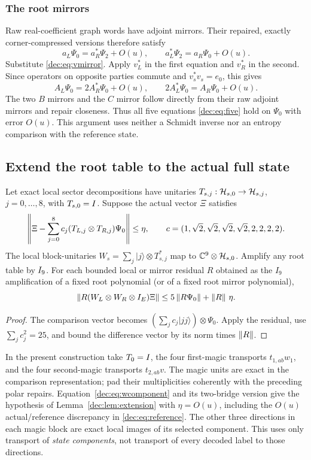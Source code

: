 \subsubsection{The root mirrors}
Raw real-coefficient graph words have adjoint mirrors. Their repaired, exactly corner-compressed versions therefore satisfy
\[
a_L\Psi_0=a_R^*\Psi_2+O(u),\qquad
a_L^*\Psi_2=a_R\Psi_0+O(u).
\]
Substitute \eqref{dec:eq:vmirror}. Apply $v_L^*$ in the first equation and $v_R^*$ in the second. Since operators on opposite parties commute and $v_s^*v_s=e_0$, this gives
\[
A_L\Psi_0=2A_R^*\Psi_0+O(u),\qquad
2A_L^*\Psi_0=A_R\Psi_0+O(u).
\]
The two $B$ mirrors and the $C$ mirror follow directly from their raw adjoint mirrors and repair closeness. Thus all five equations \eqref{dec:eq:five} hold on $\Psi_0$ with error $O(u)$. This argument uses neither a Schmidt inverse nor an entropy comparison with the reference state.

\subsection{Extend the root table to the actual full state}\label{dec:sec:extension}
\begin{lemma}\label{dec:lem:extension}
Let exact local sector decompositions have unitaries $T_{s,j}:\mathcal H_{s,0}\to\mathcal H_{s,j}$, $j=0,\ldots,8$, with $T_{s,0}=I$. Suppose the actual vector $\Xi$ satisfies
\[
\left\lVert\Xi-\sum_{j=0}^8c_j(T_{L,j}\otimes T_{R,j})\Psi_0\right\rVert\le\eta,
\qquad c=(1,\sqrt2,\sqrt2,\sqrt2,\sqrt2,2,2,2,2).
\]
The local block-unitaries $W_s=\sum_j|j\rangle\otimes T_{s,j}^*$ map to $\mathbb C^9\otimes\mathcal H_{s,0}$. Amplify any root table by $I_9$. For each bounded local or mirror residual $R$ obtained as the $I_9$ amplification of a fixed root polynomial (or of a fixed root mirror polynomial),
\begin{equation}\label{dec:eq:extension}
\left\lVert R(W_L\otimes W_R\otimes I_E)\Xi\right\rVert
\le5\left\lVert R\Psi_0\right\rVert+\left\lVert R\right\rVert\,\eta.
\end{equation}
\end{lemma}
\begin{proof}
The comparison vector becomes $(\sum_jc_j|jj\rangle)\otimes\Psi_0$. Apply the residual, use $\sum_jc_j^2=25$, and bound the difference vector by its norm times $\left\lVert R\right\rVert$.
\end{proof}

In the present construction take $T_0=I$, the four first-magic transports $t_{1,ab}w_1$, and the four second-magic transports $t_{2,ab}v$. The magic units are exact in the comparison representation; pad their multiplicities coherently with the preceding polar repairs. Equation~\eqref{dec:eq:wcomponent} and its two-bridge version give the hypothesis of Lemma~\ref{dec:lem:extension} with $\eta=O(u)$, including the $O(u)$ actual/reference discrepancy in \eqref{dec:eq:reference}. The other three directions in each magic block are exact local images of its selected component. This uses only transport of \emph{state components}, not transport of every decoded label to those directions.

